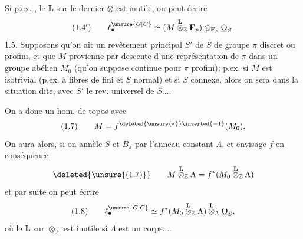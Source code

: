 Si p.ex.  , le $\mathbf L$ sur le dernier $\otimes$ est inutile, on peut écrire
\[
(1.4')\qquad \ell^{\unsure{G|C}}_{\bullet}\simeq (M\overset{\mathbf L}{\otimes}_{\mathbb Z}\mathbf F_p)\otimes_{\mathbf F_p}\underline{\mathrm O}_S.
\]
1.5.  Supposons qu'on ait un revêtement  principal $S'$ de $S$ de groupe  $\pi$ discret ou profini, et que $M$ provienne par descente d'une  représentation de $\pi$ dans un groupe abélien $M_0$ (qu'on suppose continue pour $\pi$ profini); p.ex. si $M$ est isotrivial (p.ex. à fibres de  fini et $S$  normal) et si $S$ connexe, alors on sera dans la situation dite, avec $S'$ le rev. universel de $S$....

On a donc un hom. de topos
avec
\[
(1.7)\qquad M=f^{\deleted{\unsure{*}}\inserted{-1}}(M_0).
\]
On aura alors, si on annèle $S$ et $B_\pi$ par l'anneau constant $\Lambda$, et envisage $f$ en conséquence
\[
\deleted{\unsure{(1.7)}}\qquad M\overset{\mathbf L}{\otimes}_{\mathbb Z}\Lambda=f^*(M_0\overset{\mathbf L}{\otimes}_{\mathbb Z}\Lambda)
\]
et par suite on peut écrire
\[
(1.8)\qquad \ell^{\unsure{G|C}}_{\bullet}\simeq f^*(M_0\overset{\mathbf L}{\otimes}_{\mathbb Z}\Lambda)\overset{\mathbf L}{\otimes}_{\Lambda}\underline{\mathrm O}_S,
\]
où le $\mathbf L$ sur $\otimes_\Lambda$ est inutile si $\Lambda$ est un corps....

